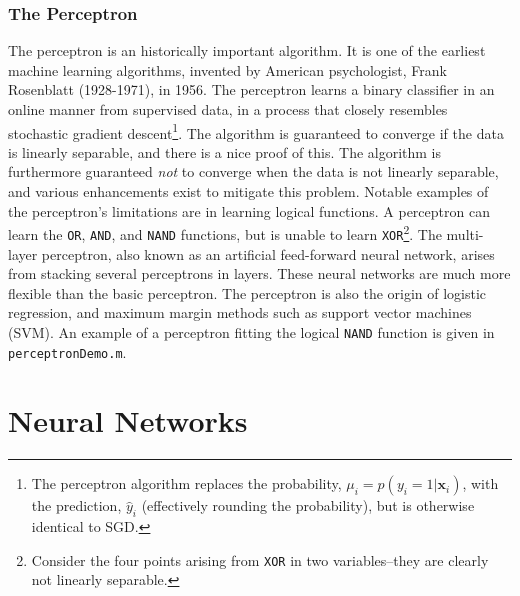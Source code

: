 \documentclass[11pt]{amsart}
\begin{document}
\subsubsection{The Perceptron}
The perceptron is an historically important algorithm. It is one of the earliest machine learning algorithms, invented by American psychologist, Frank Rosenblatt (1928-1971), in 1956. The perceptron learns a binary classifier in an online manner from supervised data, in a process that closely resembles stochastic gradient descent\footnote{The perceptron algorithm replaces the probability, $\mu_i = p(y_i = 1 | \mathbf{x}_i)$, with the prediction, $\hat{y}_i$ (effectively rounding the probability), but is otherwise identical to SGD.}. The algorithm is guaranteed to converge if the data is linearly separable, and there is a nice proof of this. The algorithm is furthermore guaranteed \emph{not} to converge when the data is not linearly separable, and various enhancements exist to mitigate this problem. Notable examples of the perceptron's limitations are in learning logical functions. A perceptron can learn the \texttt{OR}, \texttt{AND}, and \texttt{NAND} functions, but is unable to learn \texttt{XOR}\footnote{Consider the four points arising from \texttt{XOR} in two variables--they are clearly not linearly separable.}. The multi-layer perceptron, also known as an artificial feed-forward neural network, arises from stacking several perceptrons in layers. These neural networks are much more flexible than the basic perceptron. The perceptron is also the origin of logistic regression, and maximum margin methods such as support vector machines (SVM). An example of a perceptron fitting the logical \texttt{NAND} function is given in \texttt{perceptronDemo.m}.

\section{Neural Networks}
\end{document}
